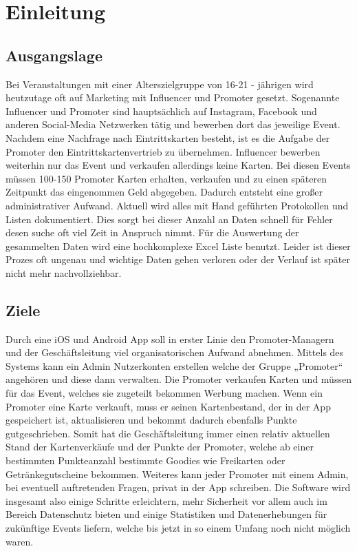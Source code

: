 \chapter{Einleitung}
\section{Ausgangslage}
Bei Veranstaltungen mit einer Alterszielgruppe von 16-21 - jährigen wird heutzutage oft auf Marketing mit Influencer und Promoter gesetzt. 
Sogenannte Influencer und Promoter sind hauptsächlich auf Instagram, Facebook und anderen Social-Media Netzwerken tätig und bewerben dort das jeweilige Event. 
Nachdem eine Nachfrage nach Eintrittskarten besteht, ist es die Aufgabe der Promoter den Eintrittskartenvertrieb zu übernehmen. 
Influencer bewerben weiterhin nur das Event und verkaufen allerdings keine Karten. 
Bei diesen Events müssen 100-150 Promoter Karten erhalten, verkaufen und zu einen späteren Zeitpunkt das eingenommen Geld abgegeben. Dadurch entsteht eine großer 
administrativer Aufwand. Aktuell wird alles mit Hand geführten Protokollen und Listen dokumentiert. Dies sorgt bei dieser Anzahl an Daten schnell für Fehler desen suche
oft viel Zeit in Anspruch nimmt. Für die Auswertung der gesammelten Daten wird eine hochkomplexe Excel Liste benutzt. Leider ist dieser Prozes oft ungenau und wichtige 
Daten gehen verloren oder der Verlauf ist später nicht mehr nachvollziehbar. 

\section{Ziele}
Durch eine iOS und Android App soll in erster Linie den Promoter-Managern und der Geschäftsleitung viel organisatorischen Aufwand abnehmen. 
Mittels des Systems kann ein Admin Nutzerkonten erstellen welche der Gruppe „Promoter“ angehören und diese dann verwalten. Die Promoter verkaufen Karten und müssen für das Event, welches sie zugeteilt bekommen Werbung machen.
Wenn ein Promoter eine Karte verkauft, muss er seinen Kartenbestand, der in der App gespeichert ist, aktualisieren und bekommt dadurch ebenfalls Punkte gutgeschrieben. 
Somit hat die Geschäftsleitung immer einen relativ aktuellen Stand der Kartenverkäufe und der Punkte der Promoter, welche ab einer bestimmten Punkteanzahl bestimmte Goodies wie Freikarten oder Getränkegutscheine bekommen.
Weiteres kann jeder Promoter mit einem Admin, bei eventuell auftretenden Fragen, privat in der App schreiben. 
Die Software wird insgesamt also einige Schritte erleichtern, mehr Sicherheit vor allem auch im Bereich Datenschutz bieten und einige Statistiken und Datenerhebungen für zukünftige Events liefern, welche bis jetzt in so einem Umfang noch nicht möglich waren.

